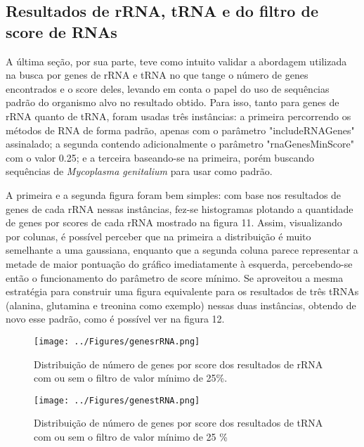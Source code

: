 \documentclass[brazilian,12pt,a4paper,final]{article}
\begin{document}
	\subsection{Resultados de rRNA, tRNA e do filtro de score de RNAs}
	\vspace{0.5cm}
	A última seção, por sua parte, teve como intuito validar a abordagem utilizada na busca por genes de rRNA e tRNA no que tange o número de genes encontrados e o score deles, levando em conta o papel do uso de sequências padrão do organismo alvo no resultado obtido. Para isso, tanto para genes de rRNA quanto de tRNA, foram usadas três instâncias: a primeira percorrendo os métodos de RNA de forma padrão, apenas com o parâmetro "includeRNAGenes" assinalado; a segunda contendo adicionalmente o parâmetro "rnaGenesMinScore" com o valor 0.25; e a terceira baseando-se na primeira, porém buscando sequências de \textit{Mycoplasma genitalium} para usar como padrão.
	
	\vspace{0.5cm}
	
	A primeira  e a segunda figura foram bem simples: com base nos resultados de genes de cada rRNA nessas instâncias, fez-se histogramas plotando a quantidade de genes por scores de cada rRNA mostrado na figura 11. Assim, visualizando por colunas, é possível perceber que na primeira a distribuição é muito semelhante a uma gaussiana, enquanto que a segunda coluna parece representar a metade de maior pontuação do gráfico imediatamente à esquerda, percebendo-se então o funcionamento do parâmetro de score mínimo. Se aproveitou a mesma estratégia para construir uma figura equivalente para os resultados de três tRNAs (alanina, glutamina e treonina como exemplo) nessas duas instâncias, obtendo de novo esse padrão, como é possível ver na figura 12.
	
	\begin{figure}[hbtp]
		\begin{center}
			\texttt{[image: ../Figures/genesrRNA.png]}
			\caption{Distribuição de número de genes por score dos resultados de rRNA com ou sem o filtro de valor mínimo de 25\%.}
			\label{fig}
		\end{center}
	\end{figure}
	
	\begin{figure}[hbtp]
		\begin{center}
			\texttt{[image: ../Figures/genestRNA.png]}
			\caption{Distribuição de número de genes por score dos resultados de tRNA com ou sem o filtro de valor mínimo de 25 \%}
			\label{fig}
		\end{center}
	\end{figure}	
	
\end{document}
